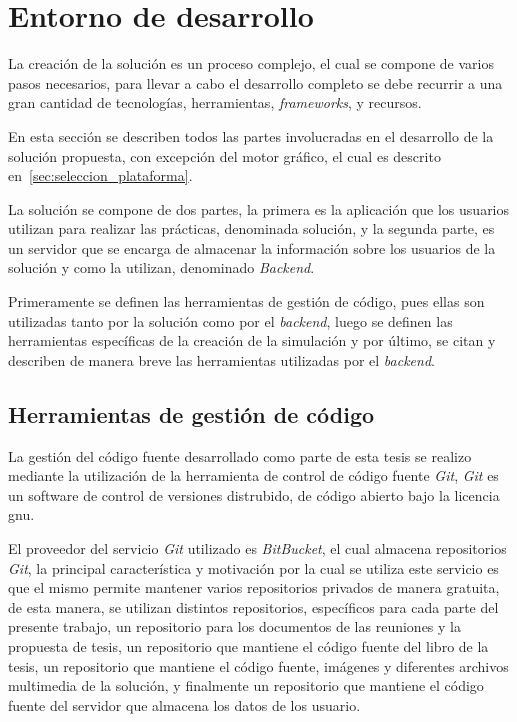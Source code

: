 \section{Entorno de desarrollo}

La creación de la solución es un proceso complejo, el cual se compone de varios
pasos necesarios, para llevar a cabo el desarrollo completo se debe recurrir a
una gran cantidad de tecnologías, herramientas, \textit{frameworks}, y recursos.

En esta sección se describen todos las partes involucradas en el desarrollo de
la solución propuesta, con excepción del motor gráfico, el cual es descrito
en~\ref{sec:seleccion_plataforma}.

La solución se compone de dos partes, la primera es la aplicación que los
usuarios utilizan para realizar las prácticas, denominada solución, y la segunda
parte, es un servidor que se encarga de almacenar la información sobre los
usuarios de la solución y como la utilizan, denominado \textit{Backend}.

Primeramente se definen las herramientas de gestión de código, pues ellas son
utilizadas tanto por la solución como por el \textit{backend}, luego se definen
las herramientas específicas de la creación de la simulación y por último, se
citan y describen de manera breve las herramientas utilizadas por el
\textit{backend}.

\subsection{Herramientas de gestión de código}

La gestión del código fuente desarrollado como parte de esta tesis se realizo
mediante la utilización de la herramienta de control de código fuente
\textit{Git}, \textit{Git} es un software de control de versiones distrubido, de
código abierto bajo la licencia \Gls{gnu}\cite{git}.

El proveedor del servicio \textit{Git} utilizado es
\textit{BitBucket}\cite{bitbucket}, el cual almacena repositorios \textit{Git},
la principal característica y motivación por la cual se utiliza este servicio es
que el mismo permite mantener varios repositorios privados de manera
gratuita\cite{bitbucket}, de esta manera, se utilizan distintos repositorios,
específicos para cada parte del presente trabajo, un repositorio para los
documentos de las reuniones y la propuesta de tesis, un repositorio que mantiene
el código fuente del libro de la tesis, un repositorio que mantiene el código
fuente, imágenes y diferentes archivos multimedia de la solución, y finalmente
un repositorio que mantiene el código fuente del servidor que almacena los datos
de los usuario.

